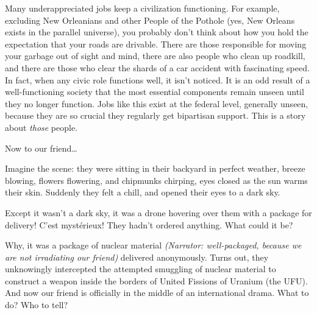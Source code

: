 {Many underappreciated jobs keep a civilization functioning. For example,
excluding New Orleanians and other People of the Pothole (yes, New Orleans
exists in the parallel universe), you probably don't think about how you hold
the expectation that your roads are drivable. There are those responsible for
moving your garbage out of sight and mind, there are also people who clean up
roadkill, and there are those who clear the shards of a car accident with
fascinating speed. In fact, when any civic role functions well, it isn't
noticed. It is an odd result of a well-functioning society that the most
essential components remain unseen until they no longer function. Jobs like
this exist at the federal level, generally unseen, because they are so crucial
they regularly get bipartisan support. This is a story about \textit{those}
people.

Now to our friend\ldots

\begin{shadequote} 

  Imagine the scene: they were sitting in their backyard in perfect weather,
  breeze blowing, flowers flowering, and chipmunks chirping, eyes closed as the
  sun warms their skin. Suddenly they felt a chill, and opened their eyes to a
  dark sky.
  
  Except it wasn't a dark sky, it was a drone hovering over them with a package
  for delivery! C'est myst\'{e}rieux! They hadn't ordered anything. What could it 
  be? 
  
  Why, it was a package of nuclear material \textit{(Narrator: well-packaged,
  because we are not irradiating our friend)} delivered anonymously. Turns out,
  they unknowingly intercepted the attempted smuggling of nuclear material to
  construct a weapon inside the borders of United Fissions of Uranium (the
  UFU). And now our friend is officially in the middle of an international
  drama. What to do? Who to tell? 

\end{shadequote}

}
